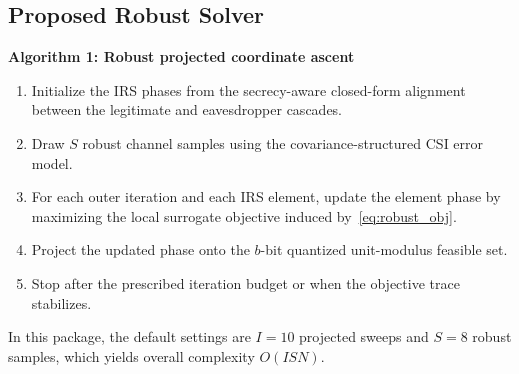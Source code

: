 \subsection{Proposed Robust Solver}
\noindent\textbf{Algorithm 1: Robust projected coordinate ascent}
\begin{enumerate}
\item Initialize the IRS phases from the secrecy-aware closed-form alignment between the legitimate and eavesdropper cascades.
\item Draw $S$ robust channel samples using the covariance-structured CSI error model.
\item For each outer iteration and each IRS element, update the element phase by maximizing the local surrogate objective induced by~\eqref{eq:robust_obj}.
\item Project the updated phase onto the $b$-bit quantized unit-modulus feasible set.
\item Stop after the prescribed iteration budget or when the objective trace stabilizes.
\end{enumerate}
\noindent In this package, the default settings are $I=10$ projected sweeps and $S=8$ robust samples, which yields overall complexity $O(ISN)$.
